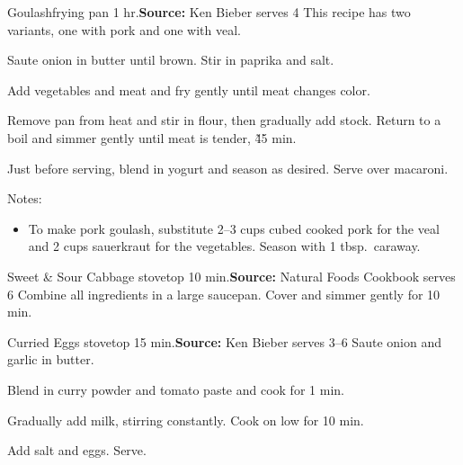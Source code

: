 \begin{recipe}{Goulash}{frying pan \hfill 1 hr.}{\textbf{Source:} Ken Bieber \hfill serves 4}
 \freeform [CB] This recipe has two variants, one with pork and one with veal.

 Saute onion in butter until brown. Stir in paprika and salt.

 Add vegetables and meat and fry gently until meat changes color.

 Remove pan from heat and stir in flour, then gradually add stock. Return to a boil and simmer gently until meat is tender, \~45 min.

 Just before serving, blend in yogurt and season as desired. Serve over macaroni.

 \freeform Notes:
 \begin{itemize}
  \item To make pork goulash, substitute 2--3 cups cubed cooked pork for the veal and 2 cups sauerkraut for the vegetables. Season with 1 tbsp.\ caraway.
 \end{itemize}
\end{recipe}

\begin{recipe}{Sweet \& Sour Cabbage}{ \hfill stovetop \hfill 10 min.}{\textbf{Source:} Natural Foods Cookbook \hfill serves 6}
 Combine all ingredients in a large saucepan. Cover and simmer gently for 10 min.
\end{recipe}

\begin{recipe}{Curried Eggs}{ \hfill stovetop \hfill 15 min.}{\textbf{Source:} Ken Bieber \hfill serves 3--6}
 Saute onion and garlic in butter.

 Blend in curry powder and tomato paste and cook for 1 min.

 Gradually add milk, stirring constantly. Cook on low for 10 min.

 Add salt and eggs. Serve.
\end{recipe}

